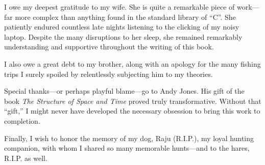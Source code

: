 I owe my deepest gratitude to my wife.
She is quite a remarkable piece of work---far more complex than anything found in the standard library of ``C''.
She patiently endured countless late nights listening to the clicking of my noisy laptop.
Despite the many disruptions to her sleep, she remained remarkably understanding and supportive throughout the writing of this book.

I also owe a great debt to my brother, along with an apology for the many fishing trips I surely spoiled by relentlessly subjecting him to my theories.

Special thanks---or perhaps playful blame---go to Andy Jones.
His gift of the book \emph{The Structure of Space and Time} proved truly transformative.
Without that ``gift,'' I might never have developed the necessary obsession to bring this work to completion.

Finally, I wish to honor the memory of my dog, Raju (R.I.P.), my loyal hunting companion, with whom I shared so many memorable hunts---and to the hares, R.I.P. as well.


